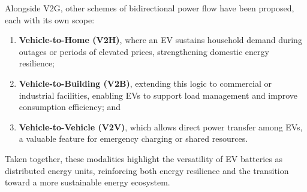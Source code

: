 Alongside V2G, other schemes of bidirectional power flow have been proposed, each with its own scope: 
\begin{enumerate}
    \item 
\textbf{Vehicle-to-Home (V2H)}, where an EV sustains household demand during outages or periods of elevated prices, strengthening domestic energy resilience;
\item
\textbf{Vehicle-to-Building (V2B)}, extending this logic to commercial or industrial facilities, enabling EVs to support load management and improve consumption efficiency; and 
\item
\textbf{Vehicle-to-Vehicle (V2V)}, which allows direct power transfer among EVs, a valuable feature for emergency charging or shared resources. 
\end{enumerate}
Taken together, these modalities highlight the versatility of EV batteries as distributed energy units, reinforcing both energy resilience and the transition toward a more sustainable energy ecosystem.

